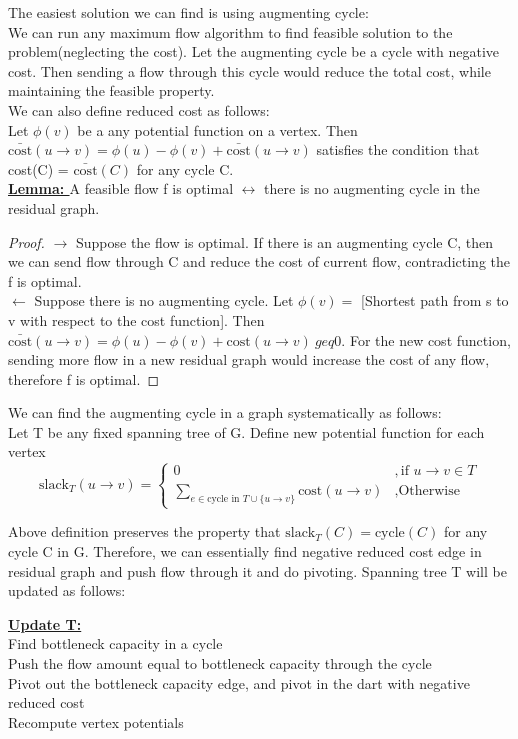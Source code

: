 \documentclass{article}
\begin{document}
The easiest solution we can find is using augmenting cycle: \\
We can run any maximum flow algorithm to find feasible solution to the problem(neglecting the cost). Let the augmenting cycle be a cycle with negative cost. Then sending a flow through this cycle would reduce the total cost, while maintaining the feasible property.  \\
We can also define reduced cost as follows: \\
Let $\phi(v)$ be a any potential function on a vertex. Then $\bar{\text{cost}}(u \rightarrow v) = \phi(u) - \phi(v) + \bar{\text{cost}} (u \rightarrow v)$ satisfies the condition that cost(C) =  $\bar{\text{cost}}(C)$ for any cycle C.\\

\textbf{\underline{Lemma: }} A feasible flow f is optimal $\leftrightarrow$ there is no augmenting cycle in the residual graph. \\
\begin{proof}
$\rightarrow$ Suppose the flow is optimal. If there is an augmenting cycle C, then we can send flow through C and reduce the cost of current flow, contradicting the f is optimal. \\
$\leftarrow$ Suppose there is no augmenting cycle. Let $\phi(v) = $ [Shortest path from s to v with respect to the cost function]. Then $\bar{\text{cost}}(u \rightarrow v) = \phi(u) - \phi(v) + \text{cost}(u \rightarrow v) \ geq 0$. For the new cost function, sending more flow in a new residual graph would increase the cost of any flow, therefore f is optimal.
\end{proof}

We can find the augmenting cycle in a graph systematically as follows: \\
Let T be any fixed spanning tree of G. Define new potential function for each vertex
\[ \text{slack}_{T}(u \rightarrow v) = \begin{cases} 0 & ,\mbox{if } u \rightarrow v \in T \\
                          \sum \limits_{e \in \text{cycle in } T \cup \{u \rightarrow v\} } \text{cost}(u \rightarrow v) & ,\mbox{Otherwise } \end{cases}\]

Above definition preserves the property that $\text{slack}_T(C) = \text{cycle}(C)$ for any cycle C in G. Therefore, we can essentially find negative reduced cost edge in residual graph and push flow through it and do pivoting. Spanning tree T will be updated as follows: \\
\begin{center}
\begin{algorithm}
\textbf{\underline{Update T:}} \\ \quad
       Find bottleneck capacity in a cycle \\ \quad
       Push the flow amount equal to bottleneck capacity through the cycle \\ \quad
       Pivot out the bottleneck capacity edge, and pivot in the dart with negative reduced cost \\ \quad
       Recompute vertex potentials
\end{algorithm}
\end{center}
\end{document}
